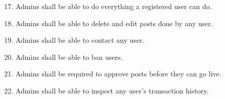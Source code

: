 \begin{description}[font=\itshape]
\begin{enumerate}
    	\setcounter{enumi}{16}
        \item Admins shall be able to do everything a registered user can do.
        \item Admins shall be able to delete and edit posts done by any user.
        \item Admins shall be able to contact any user.
        \item Admins shall be able to ban users.
        \item Admins shall be required to approve posts before they can go live.
        \item Admins shall be able to inspect any user's transaction history.
    \end{enumerate}

\end{description}
